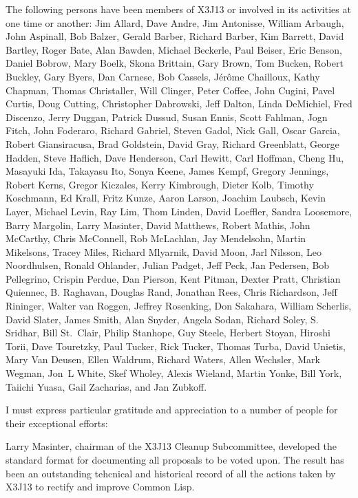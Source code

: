 The following persons have been members of X3J13 or involved in its
activities at one time or another:
Jim Allard, Dave Andre, Jim Antonisse, William Arbaugh, John
Aspinall, Bob Balzer, Gerald Barber, Richard Barber, Kim Barrett,
David Bartley, Roger Bate, Alan Bawden, Michael Beckerle, Paul
Beiser, Eric Benson, Daniel Bobrow, Mary Boelk, Skona Brittain, Gary
Brown, Tom Bucken, Robert Buckley, Gary Byers, Dan Carnese, Bob
Cassels, J\'er\^ome Chailloux, Kathy Chapman, Thomas Christaller,
Will Clinger, Peter Coffee, John Cugini, Pavel Curtis, Doug Cutting,
Christopher Dabrowski, Jeff Dalton, Linda DeMichiel, Fred Discenzo,
Jerry Duggan, Patrick Dussud, Susan Ennis, Scott Fahlman, Jogn Fitch,
John Foderaro, Richard Gabriel, Steven Gadol, Nick Gall, Oscar
Garcia, Robert Gian\-sira\-cusa, Brad Goldstein, David Gray, Richard
Greenblatt, George Hadden, Steve Haflich, Dave Henderson, Carl
Hewitt, Carl Hoffman, Cheng Hu, Masayuki Ida, Takayasu Ito, Sonya
Keene, James Kempf, Gregory Jennings, Robert Kerns, Gregor Kiczales,
Kerry Kimbrough, Dieter Kolb, Timothy Koschmann, Ed Krall, Fritz
Kunze, Aaron Larson, Joachim Laubsch, Kevin Layer, Michael Levin, Ray
Lim, Thom Linden, David Loeffler, Sandra Loosemore, Barry Margolin,
Larry Masinter, David Matthews, Robert Mathis, John McCarthy, Chris
McConnell, Rob McLachlan, Jay Mendelsohn, Martin Mikelsons, Tracey
Miles, Richard Mlyarnik, David Moon, Jarl Nilsson, Leo Noordhulsen,
Ronald Ohlander, Julian Padget, Jeff Peck, Jan Pedersen, Bob
Pellegrino, Crispin Perdue, Dan Pierson, Kent Pitman, Dexter Pratt,
Christian Quiennec, B. Raghavan, Douglas Rand, Jonathan Rees, Chris
Richardson, Jeff Rininger, Walter van Roggen, Jeffrey Rosenking,  Don
Sakahara, William Scherlis, David Slater, James Smith, Alan Snyder,
Angela Sodan, Richard Soley, S. Sridhar, Bill St.\ Clair, Philip
Stanhope, Guy Steele, Herbert Stoyan, Hiroshi Torii, Dave Touretzky,
Paul Tucker, Rick Tucker, Thomas Turba, David Unietis, Mary Van
Deusen, Ellen Waldrum, Richard Waters, Allen Wechsler, Mark Wegman,
Jon~L White, Skef Wholey, Alexis Wieland, Martin Yonke, Bill York,
Taiichi Yuasa, Gail Zacharias, and Jan Zubkoff.





I must express particular gratitude and appreciation to a number
of people for their exceptional efforts:

Larry Masinter, chairman of
the X3J13 Cleanup Subcommittee, developed the standard format for
documenting all proposals to be voted upon.  The result has been
an outstanding tehcnical and historical record of all the actions
taken by X3J13 to rectify and improve Common Lisp.

